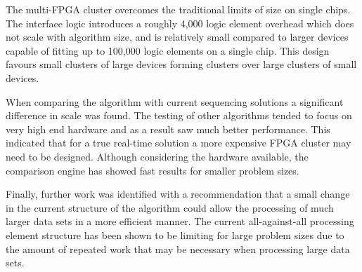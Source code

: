The multi-FPGA cluster overcomes the traditional limits of size on single chips. The interface logic introduces a roughly 4,000 logic element overhead which does not scale with algorithm size, and is relatively small compared to larger devices capable of fitting up to 100,000 logic elements on a single chip. This design favours small clusters of large devices forming clusters over large clusters of small devices. 

When comparing the algorithm with current sequencing solutions a significant difference in scale was found. The testing of other algorithms tended to focus on very high end hardware and as a result saw much better performance. This indicated that for a true real-time solution a more expensive FPGA cluster may need to be designed. Although considering the hardware available, the comparison engine has showed fast results for smaller problem sizes. 


Finally, further work was identified with a recommendation that a small change in the current structure of the algorithm could allow the processing of much larger data sets in a more efficient manner. The current all-against-all processing element structure has been shown to be limiting for large problem sizes due to the amount of repeated work that may be necessary when processing large data sets.